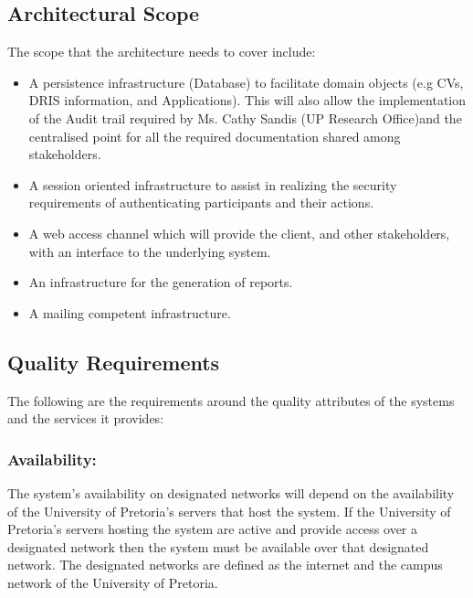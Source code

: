 \documentclass[12pt]{article}
\newcommand{\client}{Ms. Cathy Sandis (UP Research Office)}
\begin{document}
\subsection{Architectural Scope}
The scope that the architecture needs to cover include:
\begin{itemize}
\item A persistence infrastructure (Database) to facilitate domain objects (e.g CVs, DRIS information, and Applications). This will also allow the implementation of the Audit trail required by \client  and the centralised point for all the required documentation shared among stakeholders.
\item A session oriented infrastructure to assist in realizing the security requirements of authenticating participants and their actions.
\item A web access channel which will provide the client, and other stakeholders, with an interface to the underlying system.
\item An infrastructure for the generation of reports.
\item A mailing competent infrastructure.
\end{itemize}

\subsection{Quality Requirements} 
\vspace{0.2in}
The following are the requirements around the quality attributes of the systems and the services it provides:

\subsubsection{Availability:}

\begin{flushleft}

The system's availability on designated networks will depend on the availability of the University of Pretoria's servers that host the system. If the University of Pretoria's servers hosting the system are active and provide access over a designated network then the system must be available over that designated network. The designated networks are defined as the internet and the campus network of the University of Pretoria.

\end{flushleft}
\end{document}

